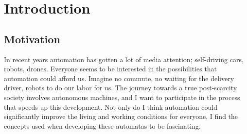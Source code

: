 \section{Introduction}
\subsection{Motivation}

In recent years automation has gotten a lot of media attention; self-driving cars, robots, drones. Everyone seems to be interested in
the possibilities that automation could afford us. Imagine no commute, no waiting for the delivery driver, robots to do our labor
for us. The journey towards a true post-scarcity society involves autonomous machines, and I want to participate in the process that speeds
up this development. Not only do I think automation could significantly improve the living and working conditions for everyone, I find
the concepts used when developing these automatas to be fascinating.

